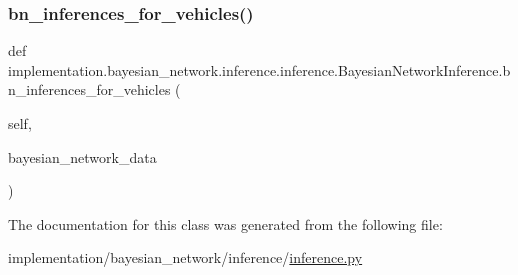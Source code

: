 \subsubsection{\texorpdfstring{bn\+\_\+inferences\+\_\+for\+\_\+vehicles()}{bn\_inferences\_for\_vehicles()}}
{\footnotesize\ttfamily def implementation.\+bayesian\+\_\+network.\+inference.\+inference.\+Bayesian\+Network\+Inference.\+bn\+\_\+inferences\+\_\+for\+\_\+vehicles (\begin{DoxyParamCaption}\item[{}]{self,  }\item[{}]{bayesian\+\_\+network\+\_\+data }\end{DoxyParamCaption})}



The documentation for this class was generated from the following file\+:\begin{DoxyCompactItemize}
\item 
implementation/bayesian\+\_\+network/inference/\hyperlink{inference_8py}{inference.\+py}\end{DoxyCompactItemize}

